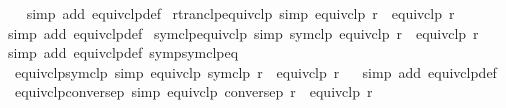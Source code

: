 \begin{isabellebody}
%
\isadelimproof
\ \ %
\endisadelimproof
%
\isatagproof
{}\isamarkupfalse%
{\isacharparenleft}{\kern0pt}simp\ add{\isacharcolon}{\kern0pt}\ equivclp{\isacharunderscore}{\kern0pt}def{\isacharparenright}{\kern0pt}%
\endisatagproof
{\isafoldproof}%
%
\isadelimproof
\isanewline
%
\endisadelimproof
\isanewline
{}\isamarkupfalse%
\ rtranclp{\isacharunderscore}{\kern0pt}equivclp\ {\isacharbrackleft}{\kern0pt}simp{\isacharbrackright}{\kern0pt}{\isacharcolon}{\kern0pt}\ {\isachardoublequoteopen}{\isacharparenleft}{\kern0pt}equivclp\ r{\isacharparenright}{\kern0pt}\isactrlsup {\isacharasterisk}{\kern0pt}\isactrlsup {\isacharasterisk}{\kern0pt}\ {\isacharequal}{\kern0pt}\ equivclp\ r{\isachardoublequoteclose}\isanewline
%
\isadelimproof
\ \ %
\endisadelimproof
%
\isatagproof
{}\isamarkupfalse%
{\isacharparenleft}{\kern0pt}simp\ add{\isacharcolon}{\kern0pt}\ equivclp{\isacharunderscore}{\kern0pt}def{\isacharparenright}{\kern0pt}%
\endisatagproof
{\isafoldproof}%
%
\isadelimproof
\isanewline
%
\endisadelimproof
\isanewline
{}\isamarkupfalse%
\ symclp{\isacharunderscore}{\kern0pt}equivclp\ {\isacharbrackleft}{\kern0pt}simp{\isacharbrackright}{\kern0pt}{\isacharcolon}{\kern0pt}\ {\isachardoublequoteopen}symclp\ {\isacharparenleft}{\kern0pt}equivclp\ r{\isacharparenright}{\kern0pt}\ {\isacharequal}{\kern0pt}\ equivclp\ r{\isachardoublequoteclose}\isanewline
%
\isadelimproof
\ \ %
\endisadelimproof
%
\isatagproof
{}\isamarkupfalse%
{\isacharparenleft}{\kern0pt}simp\ add{\isacharcolon}{\kern0pt}\ equivclp{\isacharunderscore}{\kern0pt}def\ symp{\isacharunderscore}{\kern0pt}symclp{\isacharunderscore}{\kern0pt}eq{\isacharparenright}{\kern0pt}%
\endisatagproof
{\isafoldproof}%
%
\isadelimproof
\isanewline
%
\endisadelimproof
\isanewline
{}\isamarkupfalse%
\ equivclp{\isacharunderscore}{\kern0pt}symclp\ {\isacharbrackleft}{\kern0pt}simp{\isacharbrackright}{\kern0pt}{\isacharcolon}{\kern0pt}\ {\isachardoublequoteopen}equivclp\ {\isacharparenleft}{\kern0pt}symclp\ r{\isacharparenright}{\kern0pt}\ {\isacharequal}{\kern0pt}\ equivclp\ r{\isachardoublequoteclose}\isanewline
%
\isadelimproof
\ \ %
\endisadelimproof
%
\isatagproof
{}\isamarkupfalse%
{\isacharparenleft}{\kern0pt}simp\ add{\isacharcolon}{\kern0pt}\ equivclp{\isacharunderscore}{\kern0pt}def{\isacharparenright}{\kern0pt}%
\endisatagproof
{\isafoldproof}%
%
\isadelimproof
\isanewline
%
\endisadelimproof
\isanewline
{}\isamarkupfalse%
\ equivclp{\isacharunderscore}{\kern0pt}conversep\ {\isacharbrackleft}{\kern0pt}simp{\isacharbrackright}{\kern0pt}{\isacharcolon}{\kern0pt}\ {\isachardoublequoteopen}equivclp\ {\isacharparenleft}{\kern0pt}conversep\ r{\isacharparenright}{\kern0pt}\ {\isacharequal}{\kern0pt}\ equivclp\ r{\isachardoublequoteclose}\isanewline

\end{isabellebody}
